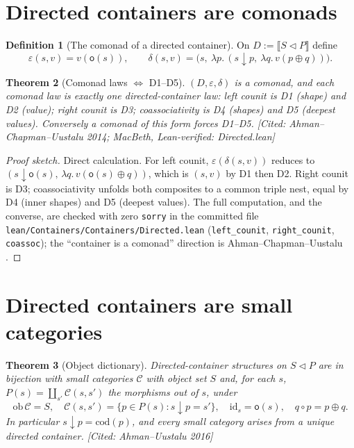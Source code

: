 \documentclass[11pt,a4paper]{book}
\newcommand{\cont}[2]{#1 \triangleleft #2}
\newcommand{\Ext}[1]{\llbracket #1 \rrbracket}
\newcommand{\id}{\mathrm{id}}
\newcommand{\cod}{\mathrm{cod}}
\newcommand{\ob}{\mathrm{ob}\,}
\theoremstyle{plain}
\newtheorem{Theorem}{Theorem}[chapter]
\theoremstyle{definition}
\newtheorem{Definition}[Theorem]{Definition}
\theoremstyle{remark}
\newcommand{\prov}[1]{\hfill\textsf{\footnotesize[#1]}}
\begin{document}
\section{Directed containers are comonads}

\begin{Definition}[The comonad of a directed container]\label{def:dcomonad}
On $D:=\Ext{\cont SP}$ define
\[
  \varepsilon(s,v)=v(\mathsf o(s)),\qquad
  \delta(s,v)=\bigl(s,\ \lambda p.\,(s\downarrow p,\ \lambda q.\, v(p\oplus q))\bigr).
\]
\end{Definition}

\begin{Theorem}[Comonad laws $\Longleftrightarrow$ D1--D5]\label{thm:comonad}
$(D,\varepsilon,\delta)$ is a comonad, and each comonad law is exactly one
directed-container law: left counit is D1 (shape) and D2 (value); right counit is
D3; coassociativity is D4 (shapes) and D5 (deepest values). Conversely a comonad
of this form forces D1--D5.
\prov{Cited: Ahman--Chapman--Uustalu 2014; MacBeth, Lean-verified:
Directed.lean}
\end{Theorem}

\begin{proof}[Proof sketch]
Direct calculation. For left counit, $\varepsilon(\delta(s,v))$ reduces to
$(s\downarrow\mathsf o(s),\,\lambda q.\,v(\mathsf o(s)\oplus q))$, which is $(s,v)$
by D1 then D2. Right counit is D3; coassociativity unfolds both composites to a
common triple nest, equal by D4 (inner shapes) and D5 (deepest values). The full
computation, and the converse, are checked with zero \texttt{sorry} in the
committed file \texttt{lean/Containers/Containers/Directed.lean}
(\texttt{left\_counit}, \texttt{right\_counit}, \texttt{coassoc}); the
``container is a comonad'' direction is Ahman--Chapman--Uustalu \cite{ACU14}.
\end{proof}

\section{Directed containers are small categories}

\begin{Theorem}[Object dictionary]\label{thm:objdict}
Directed-container structures on $\cont SP$ are in bijection with small categories
$\mathcal C$ with object set $S$ and, for each $s$,
$P(s)=\coprod_{s'}\mathcal C(s,s')$ the morphisms \emph{out of} $s$, under
\[
  \ob\mathcal C=S,\quad
  \mathcal C(s,s')=\{p\in P(s):s\downarrow p=s'\},\quad
  \id_s=\mathsf o(s),\quad
  q\circ p=p\oplus q .
\]
In particular $s\downarrow p=\cod(p)$, and every small category arises from a
unique directed container.
\prov{Cited: Ahman--Uustalu 2016}
\end{Theorem}
\end{document}

